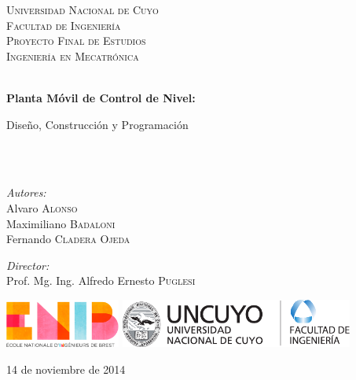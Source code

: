 \begin{titlepage}

\begin{center}


\textsc{\LARGE Universidad Nacional de Cuyo}\\[1.5cm]
\textsc{\LARGE Facultad de Ingeniería}\\[1.5cm]

\textsc{\Large Proyecto Final de Estudios}\\[0.5cm]
\textsc{\Large Ingeniería en Mecatrónica }\\[0.5cm]

\HRule \\[0.4cm]
{ \huge \bfseries Planta Móvil de Control de Nivel:

Diseño, Construcción y Programación}\\[0.4cm]

\HRule \\[1.5cm]

\begin{minipage}{0.4\textwidth}
\begin{flushleft} \large
\emph{Autores:}\\
Alvaro \textsc{Alonso} \\
Maximiliano \textsc{Badaloni} \\
Fernando \textsc{Cladera Ojeda}
\end{flushleft}
\end{minipage}
\begin{minipage}{0.4\textwidth}
\begin{flushright} \large
\emph{Director:} \\
Prof. Mg. Ing. Alfredo Ernesto \textsc{Puglesi}
\end{flushright}
\end{minipage}

\vfill

\begin{minipage}[c]{0.9\textwidth}
  \centering
  \includegraphics[height=16mm]{Caratula/Logos/ENIB-cmjn.png}
  \hfill
  \includegraphics[height=16mm]{Caratula/Logos/LogoFacu.pdf}
\end{minipage}

\vspace{1cm}

{\large 14 de noviembre de 2014}

\end{center}

\end{titlepage}
